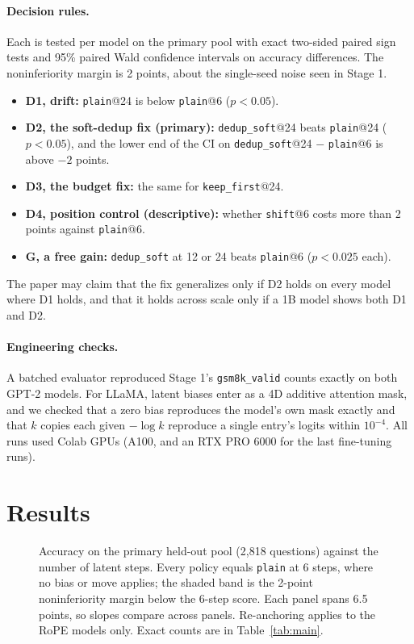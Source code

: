 \documentclass[11pt]{article}
\newcommand{\pol}[1]{\texttt{#1}}
\begin{document}
\paragraph{Decision rules.} Each is tested per model on the primary pool with exact two-sided paired sign tests and 95\%
paired Wald confidence intervals on accuracy differences. The noninferiority margin is 2 points, about the single-seed
noise seen in Stage 1.
\begin{itemize}
  \item \textbf{D1, drift:} \pol{plain}@24 is below \pol{plain}@6 ($p < 0.05$).
  \item \textbf{D2, the soft-dedup fix (primary):} \pol{dedup\_soft}@24 beats \pol{plain}@24 ($p < 0.05$), and the lower
    end of the CI on \pol{dedup\_soft}@24 $-$ \pol{plain}@6 is above $-2$ points.
  \item \textbf{D3, the budget fix:} the same for \pol{keep\_first}@24.
  \item \textbf{D4, position control (descriptive):} whether \pol{shift}@6 costs more than 2 points against \pol{plain}@6.
  \item \textbf{G, a free gain:} \pol{dedup\_soft} at 12 or 24 beats \pol{plain}@6 ($p < 0.025$ each).
\end{itemize}
The paper may claim that the fix generalizes only if D2 holds on every model where D1 holds, and that it holds across scale
only if a 1B model shows both D1 and D2.

\paragraph{Engineering checks.} A batched evaluator reproduced Stage 1's \texttt{gsm8k\_valid} counts exactly on both GPT-2
models. For LLaMA, latent biases enter as a 4D additive attention mask, and we checked that a zero bias reproduces the
model's own mask exactly and that $k$ copies each given $-\log k$ reproduce a single entry's logits within $10^{-4}$. All
runs used Colab GPUs (A100, and an RTX PRO 6000 for the last fine-tuning runs).

\section{Results}
\label{sec:results}

\begin{figure}[t]
\centering

\caption{Accuracy on the primary held-out pool (2,818 questions) against the number of latent steps. Every policy equals
\pol{plain} at 6 steps, where no bias or move applies; the shaded band is the 2-point noninferiority margin below the 6-step
score. Each panel spans 6.5 points, so slopes compare across panels. Re-anchoring applies to the RoPE models only. Exact counts
are in Table~\ref{tab:main}.}
\label{fig:depth}
\end{figure}
\end{document}
